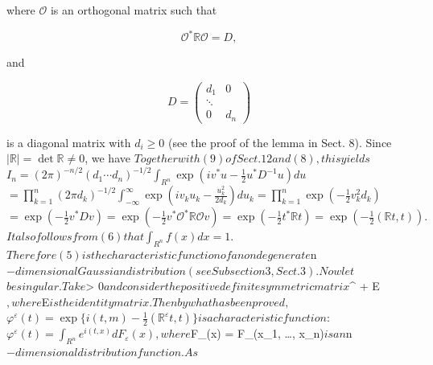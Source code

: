 where $\mathcal{O}$ is an orthogonal matrix such that

$$\mathcal{O}^*\mathbb{R}\mathcal{O} = D,$$

and

$$D = \begin{pmatrix} d_1 & 0 \\ \ddots & \\ 0 & d_n \end{pmatrix}$$

is a diagonal matrix with $d_i \geq 0$ (see the proof of the lemma in Sect. 8). Since $|\mathbb{R}| = \det \mathbb{R} \neq 0$, we have $

Together with (9) of Sect. 12 and (8), this yields

$$I_n = (2\pi)^{-n/2} (d_1 \cdots d_n)^{-1/2} \int_{R^n} \exp(iv^* u - \frac{1}{2} u^* D^{-1} u) du$$

$$= \prod_{k=1}^{n} (2\pi d_k)^{-1/2} \int_{-\infty}^{\infty} \exp\left(iv_k u_k - \frac{u_k^2}{2d_k}\right) du_k = \prod_{k=1}^{n} \exp\left(-\frac{1}{2} v_k^2 d_k\right)$$

$$= \exp\left(-\frac{1}{2} v^* Dv\right) = \exp\left(-\frac{1}{2} v^* \mathcal{O}^* \mathbb{R} \mathcal{O} v\right) = \exp\left(-\frac{1}{2} t^* \mathbb{R} t\right) = \exp\left(-\frac{1}{2} (\mathbb{R} t, t)\right).$$

It also follows from (6) that

$$\int_{R^n} f(x) dx = 1. \tag{9}$$

Therefore (5) is the characteristic function of a nondegenerate $n$-dimensional Gaussian distribution (see Subsection 3, Sect. 3).

Now let $$ be singular. Take $\varepsilon > 0$ and consider the positive definite symmetric matrix $^\varepsilon \equiv {} + \varepsilon E$, where $E$ is the identity matrix. Then by what has been proved,

$$\varphi^\varepsilon(t) = \exp\{i(t, m) - \frac{1}{2} (\mathbb{R}^\varepsilon t, t)\}$$

is a characteristic function:

$$\varphi^\varepsilon(t) = \int_{R^n} e^{i(t,x)} dF_\varepsilon(x),$$

where $F_\varepsilon(x) = F_\varepsilon(x_1, \ldots, x_n)$ is an $n$-dimensional distribution function.

As $\varepsilon \to
